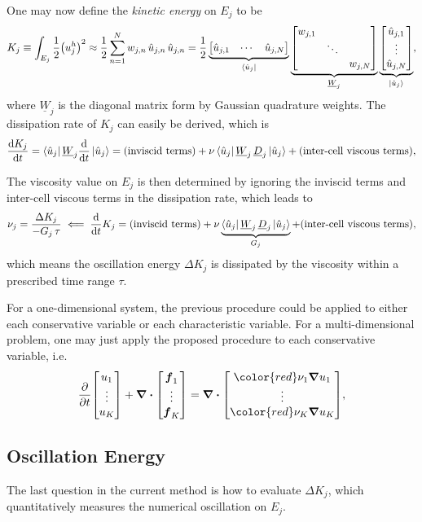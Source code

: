 \documentclass[10pt]{article}
\begin{document}
%
One may now define the \emph{kinetic energy} on $E_j$ to be
$$
K_{j}\equiv\int_{E_{j}}\frac{1}{2}\qty(u_{j}^{h})^{2}\approx\frac{1}{2}\sum_{n=1}^{N}w_{j,n}\,\hat{u}_{j,n}\,\hat{u}_{j,n}=\frac{1}{2}\underbrace{\begin{bmatrix}\hat{u}_{j,1} & \cdots & \hat{u}_{j,N}\end{bmatrix}}_{\bra{\hat{u}_{j}}}\underbrace{\begin{bmatrix}w_{j,1}\\
 & \ddots\\
 &  & w_{j,N}
\end{bmatrix}}_{\underline{W}_{j}}\underbrace{\begin{bmatrix}\hat{u}_{j,1}\\
\vdots\\
\hat{u}_{j,N}
\end{bmatrix}}_{\ket{\hat{u}_{j}}},
$$
where $\underline{W}_{j}$ is the diagonal matrix form by Gaussian quadrature weights.
%
The dissipation rate of $K_j$ can easily be derived, which is
$$
\dv{K_j}{t}=\bra{\hat{u}_{j}}\underline{W}_{j}\dv{t}\ket{\hat{u}_{j}}=(\text{inviscid terms})+\nu\bra{\hat{u}_{j}}\underline{W}_{j}\,\underline{D}_{j}\ket{\hat{u}_{j}}+(\text{inter-cell viscous terms}),
$$

The viscosity value on $E_j$ is then determined by ignoring the inviscid terms and inter-cell viscous terms in the dissipation rate, which leads to
$$
\nu_{j}=\frac{\Delta K_{j}}{-G_{j}\,\tau}
\impliedby\dv{t}K_{j}=(\text{inviscid terms})+\nu\underbrace{\bra{\hat{u}_{j}}\underline{W}_{j}\,\underline{D}_{j}\ket{\hat{u}_{j}}}_{G_{j}}+(\text{inter-cell viscous terms}),
$$
which means the oscillation energy $\Delta K_{j}$ is dissipated by the viscosity within a prescribed time range $\tau$.

%
For a one-dimensional system, the previous procedure could be applied to either each conservative variable or each characteristic variable.
%
For a multi-dimensional problem, one may just apply the proposed procedure to each conservative variable, i.e.
$$
\pdv{t}\mqty[u_1\\ \vdots \\ u_K]+\grad\vdot\mqty[\vb*{f}_1\\ \vdots \\ \vb*{f}_K]
=\grad\vdot\mqty[{\color{red}\nu_1}\grad{u}_1\\ \vdots \\ {\color{red}\nu_K}\grad{u}_K],
$$

\subsection{Oscillation Energy}
The last question in the current method is how to evaluate $\Delta K_j$, which quantitatively measures the numerical oscillation on $E_j$.
%
\end{document}
